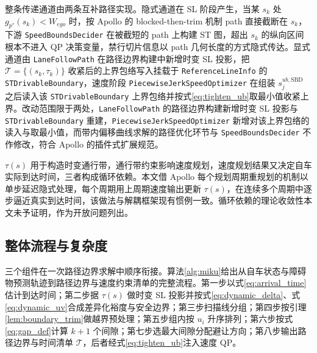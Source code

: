 \documentclass[a4paper,11pt]{ctexart}
\theoremstyle{definition}
\begin{document}
整条传递通道由两条互补路径实现。隐式通道在 SL 阶段产生，当某 $s_k$ 处 $g_{p^{*}}(s_k)<W_{ego}$ 时，按 Apollo 的 blocked-then-trim 机制 path 直接截断在 $s_k$，下游 \texttt{SpeedBoundsDecider} 在被截短的 path 上构建 ST 图，超出 $s_k$ 的纵向区间根本不进入 QP 决策变量，禁行切片信息以 path 几何长度的方式隐式传达。显式通道由 \texttt{LaneFollowPath} 在路径边界构建中新增时变 SL 投影，把 $\mathcal{T}=\{(s_k, \tau_k)\}$ 收紧后的上界包络写入挂载于 \texttt{ReferenceLineInfo} 的 \texttt{STDrivableBoundary}，速度阶段 \texttt{PiecewiseJerkSpeedOptimizer} 在组装 $s_j^{ub,\mathrm{SBD}}$ 之后读入该 \texttt{STDrivableBoundary} 上界包络并按式\eqref{eq:tighten_ub}取最小值收紧上界。改动范围限于两处，\texttt{LaneFollowPath} 的路径边界构建新增时变 SL 投影与 \texttt{STDrivableBoundary} 重建，\texttt{PiecewiseJerkSpeedOptimizer} 新增对该上界包络的读入与取最小值，而带内偏移曲线求解的路径优化环节与 \texttt{SpeedBoundsDecider} 不作修改，符合 Apollo 的插件式扩展规范。

$\tau(s)$ 用于构造时变通行带，通行带约束影响速度规划，速度规划结果又决定自车实际到达时间，三者构成循环依赖。本文借 Apollo 每个规划周期重规划的机制以单步延迟隐式处理，每个周期用上周期速度输出更新 $\tau(s)$，在连续多个周期中逐步逼近真实到达时间，该做法与解耦框架现有惯例一致。循环依赖的理论收敛性本文未予证明，作为开放问题列出。

\subsection{整体流程与复杂度}
\label{sec:method_algorithm}

三个组件在一次路径边界求解中顺序衔接。算法\ref{alg:miku}给出从自车状态与障碍物预测轨迹到路径边界与速度约束清单的完整流程。第一步以式\eqref{eq:arrival_time}估计到达时间；第二步据 $\tau(s)$ 做时变 SL 投影并按式\eqref{eq:dynamic_delta}、式\eqref{eq:dynamic_uv}合成差异化裕度与安全边界；第三步扫描线分组；第四步按引理\ref{lem:boundary_trim}做越界预处理；第五步组内按 $u_i$ 升序排列；第六步按式\eqref{eq:gap_def}计算 $k+1$ 个间隙；第七步选最大间隙分配避让方向；第八步输出路径边界与时间清单 $\mathcal{T}$，后者经式\eqref{eq:tighten_ub}注入速度 QP。
\end{document}
